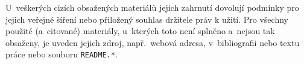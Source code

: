 \documentclass[
  master,
  program=ainfvs,
  biblatex,
  figures=false,
  glossaries,
  index
]{kidiplom}
\begin{document}
U~veškerých cizích obsažených materiálů jejich
zahrnutí dovolují podmínky pro jejich veřejné šíření nebo přiložený souhlas
držitele práv k užití. Pro všechny použité (a~citované) materiály,
u~kterých toto není splněno a~nejsou tak obsaženy, je uveden
jejich zdroj, např.~webová adresa, v~bibliografii nebo textu práce
nebo souboru \texttt{README.*}.


\printglossary


\nocite{*}
\printbibliography

%
%

\printindex
\end{document}
